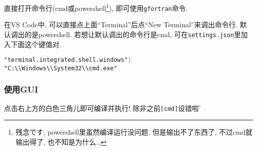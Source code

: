 直接打开命令行(cmd或powershell\footnote{残念です, powershell里虽然编译运行没问题, 但是输出不了东西了, 不过cmd就输出得了, 也不知是为什么\dots{}}), 即可使用\verb|gfortran|命令.

在VS Code中, 可以直接点上面``Terminal''后点``New Terminal''来调出命令行. 默认调出的是powershell. 若想让默认调出的命令行是cmd, 可在\verb|settings.json|里加入下面这个键值对.
\begin{verbatim}
"terminal.integrated.shell.windows":
"C:\\Windows\\System32\\cmd.exe"
\end{verbatim}

\subsubsection{使用GUI}
点击右上方的白色三角儿即可编译并执行! 除非之前\verb|[cmd]|设错啦$\!\text{\~{}}$
